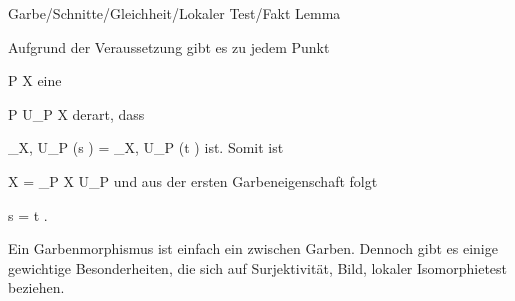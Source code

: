{Garbe/Schnitte/Gleichheit/Lokaler Test/Fakt}
{Lemma}
{}
{



\faktzusatz {}
\faktzusatz {}





}
{





Aufgrund der Veraussetzung gibt es zu jedem Punkt

\mavergleichskette
{\vergleichskette
{P
}
{ \in }{ X
}
{  }{
}
{    }{
}
{   }{
}
}
{}{}{}
eine

\mavergleichskette
{\vergleichskette
{P
}
{ \in }{ U_P
}
{ \subseteq }{ X
}
{    }{
}
{   }{
}
}
{}{}{}
derart, dass

\mavergleichskettedisp
{\vergleichskette
{ \rho_{X, U_P } (s )
}
{ =} {\rho_{X, U_P } (t )
}
{ } {
}
{ } {
}
{ } {
}
}
{}{}{}
ist. Somit ist

\mavergleichskettedisp
{\vergleichskette
{X
}
{ =} { \bigcup_{P \in X} U_P
}
{ } {
}
{ } {
}
{ } {
}
}
{}{}{}
und aus der ersten Garbeneigenschaft folgt

\mavergleichskette
{\vergleichskette
{s
}
{ = }{t
}
{  }{
}
{    }{
}
{   }{
}
}
{}{}{.}




}







Ein Garbenmorphismus ist einfach ein
zwischen Garben. Dennoch gibt es einige gewichtige Besonderheiten, die sich auf Surjektivität, Bild, lokaler Isomorphietest beziehen.






